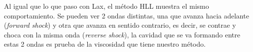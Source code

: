 \documentclass[12pt,a4paper]{book}
\begin{document}
Al igual que lo que paso con Lax, el método HLL muestra el mismo comportamiento. Se pueden ver 2 ondas distintas, una que avanza hacia adelante (\emph{forward shock}) y otra que avanza en sentido contrario, es decir, se contrae y choca con la misma onda (\emph{reverse shock}), la cavidad que se va formando entre estas 2 ondas es prueba de la viscosidad que tiene nuestro método.

\begin{figure}
\centering
{}

\end{figure}
\end{document}
